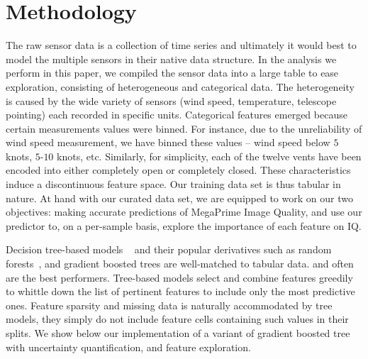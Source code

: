 \section{Methodology}\label{sec:method}

The raw sensor data is a collection of time series and ultimately it would best to model the multiple sensors in their native data structure. In the analysis we perform in this paper, we compiled the sensor data into a large table to ease exploration, consisting of heterogeneous and categorical data. The heterogeneity is caused by the wide variety of sensors (wind speed, temperature, telescope pointing) each recorded in specific units. Categorical features emerged because certain measurements values were binned. For instance, due to the unreliability of wind speed measurement, we have binned these values -- wind speed below $5$ knots, $5$-$10$ knots, etc. Similarly, for simplicity, each of the twelve vents have been encoded into either completely open or completely closed. These characteristics induce a discontinuous feature space. Our training data set is thus tabular in nature. 
At hand with our curated data set, we are equipped to work on our two objectives: making accurate predictions of  MegaPrime Image Quality, and use our predictor to, on a per-sample basis, explore the importance of each feature on IQ. 



Decision tree-based models ~\citep{decision_trees} and their popular derivatives such as random forests~\citep{randomforests}, and gradient boosted trees \citep{gradient_boosted_decision_trees_gbdt} are well-matched to tabular data. and often are the best performers. Tree-based models select and combine features greedily to whittle down the list of pertinent features to include only the most predictive ones. Feature sparsity and missing data is naturally accommodated by tree models, they simply do not include feature cells containing such values in their splits. We show below our implementation of a variant of gradient boosted tree with uncertainty quantification, and feature exploration.

